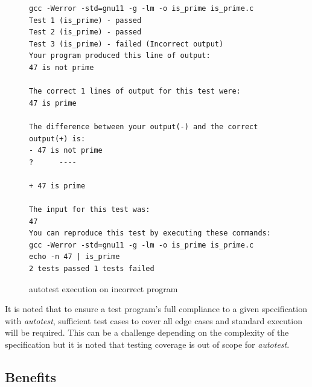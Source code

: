 \documentclass[hidelinks]{report}
\begin{document}
\begin{figure}[h]
	\centering
	\begin{lstlisting}[breaklines=true, linewidth=\linewidth]
gcc -Werror -std=gnu11 -g -lm -o is_prime is_prime.c
Test 1 (is_prime) - passed
Test 2 (is_prime) - passed
Test 3 (is_prime) - failed (Incorrect output)
Your program produced this line of output:
47 is not prime

The correct 1 lines of output for this test were:
47 is prime

The difference between your output(-) and the correct output(+) is:
- 47 is not prime
?      ----

+ 47 is prime

The input for this test was:
47
You can reproduce this test by executing these commands:
gcc -Werror -std=gnu11 -g -lm -o is_prime is_prime.c
echo -n 47 | is_prime
2 tests passed 1 tests failed
	\end{lstlisting}
	\caption{autotest execution on incorrect program}
	\label{fig:autotest5}
\end{figure}

It is noted that to ensure a test program's full compliance to a given specification with \textit{autotest}, sufficient test cases to cover all edge cases and standard execution will be required. This can be a challenge depending on the complexity of the specification but it is noted that testing coverage is out of scope for \textit{autotest}.

\subsection{Benefits}
\end{document}
